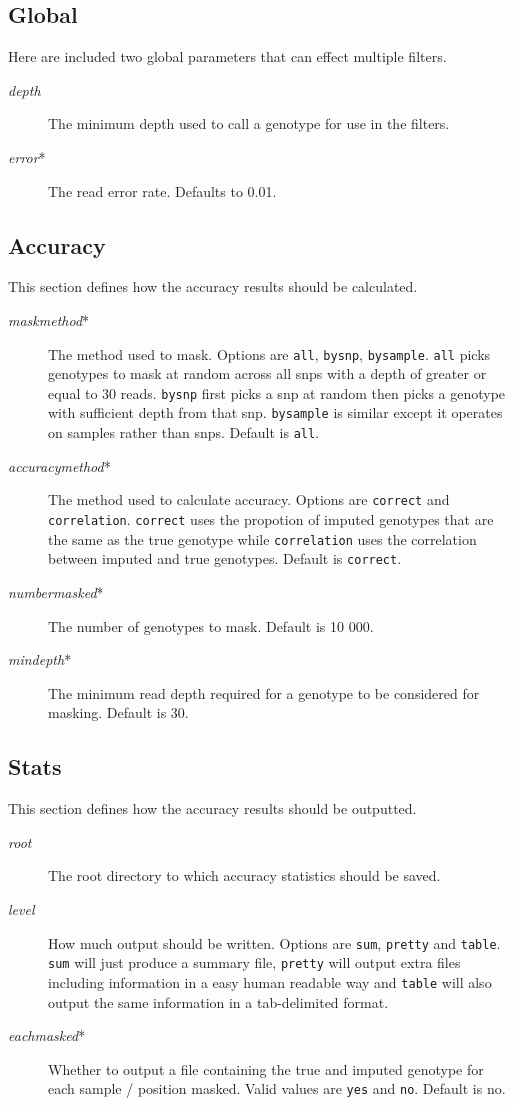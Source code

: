 \documentclass[10pt]{report}
\begin{document}
\subsection{Global}
Here are included two global parameters that can effect multiple filters.
\begin{description}
\item[\emph{depth}] The minimum depth used to call a genotype for use in the filters.
\item[\emph{error}*] The read error rate.  Defaults to 0.01.
\end{description}

\subsection{Accuracy}
This section defines how the accuracy results should be calculated.
\begin{description}
\item[\emph{maskmethod}*] The method used to mask.  Options are \texttt{all}, \texttt{bysnp}, \texttt{bysample}.  \texttt{all} picks genotypes to mask at random across all snps with a depth of greater or equal to 30 reads.  \texttt{bysnp} first picks a snp at random then picks a genotype with sufficient depth from that snp.  \texttt{bysample} is similar except it operates on samples rather than snps.  Default is \texttt{all}.
\item[\emph{accuracymethod}*] The method used to calculate accuracy.  Options are \texttt{correct} and \texttt{correlation}.  \texttt{correct} uses the propotion of imputed genotypes that are the same as the true genotype while \texttt{correlation} uses the correlation between imputed and true genotypes.  Default is \texttt{correct}.
\item[\emph{numbermasked}*] The number of genotypes to mask.  Default is 10 000.
\item[\emph{mindepth}*] The minimum read depth required for a genotype to be considered for masking.  Default is 30.
\end{description}

\subsection{Stats}
This section defines how the accuracy results should be outputted.
\begin{description}
\item[\emph{root}] The root directory to which accuracy statistics should be saved.
\item[\emph{level}] How much output should be written.  Options are \texttt{sum}, \texttt{pretty} and \texttt{table}.  \texttt{sum} will just produce a summary file, \texttt{pretty} will output extra files including information in a easy human readable way and \texttt{table} will also output the same information in a tab-delimited format.
\item[\emph{eachmasked}*] Whether to output a file containing the true and imputed genotype for each sample / position masked.  Valid values are \texttt{yes} and \texttt{no}.  Default is no.
\end{description}
\end{document}
